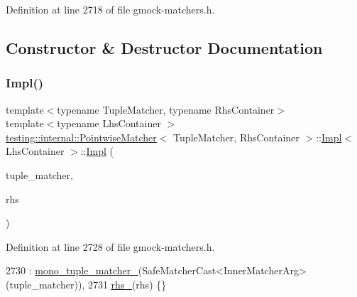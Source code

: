Definition at line 2718 of file gmock-\/matchers.\+h.



\subsection{Constructor \& Destructor Documentation}
\mbox{\label{classtesting_1_1internal_1_1PointwiseMatcher_1_1Impl_aaf6841b254ef78395919dfc5705dd152}} 
\subsubsection{\texorpdfstring{Impl()}{Impl()}}
{\footnotesize\ttfamily template$<$typename Tuple\+Matcher, typename Rhs\+Container$>$ \\
template$<$typename Lhs\+Container $>$ \\
\hyperlink{classtesting_1_1internal_1_1PointwiseMatcher}{testing\+::internal\+::\+Pointwise\+Matcher}$<$ Tuple\+Matcher, Rhs\+Container $>$\+::\hyperlink{classtesting_1_1internal_1_1PointwiseMatcher_1_1Impl}{Impl}$<$ Lhs\+Container $>$\+::\hyperlink{classtesting_1_1internal_1_1PointwiseMatcher_1_1Impl}{Impl} (\begin{DoxyParamCaption}\item[{const Tuple\+Matcher \&}]{tuple\+\_\+matcher,  }\item[{const \hyperlink{classtesting_1_1internal_1_1PointwiseMatcher_aadbaec8c93351f29b103816c2e397edd}{Rhs\+Stl\+Container} \&}]{rhs }\end{DoxyParamCaption})\hspace{0.3cm}{\ttfamily [inline]}}



Definition at line 2728 of file gmock-\/matchers.\+h.


\begin{DoxyCode}
2730         : \hyperlink{classtesting_1_1internal_1_1PointwiseMatcher_1_1Impl_ac94a851d56fe3f4f900da94cdc08c973}{mono\_tuple\_matcher\_}(SafeMatcherCast<InnerMatcherArg>(tuple\_matcher)),
2731           \hyperlink{classtesting_1_1internal_1_1PointwiseMatcher_1_1Impl_a7f00c6c50d20c8c274428106b6c8e9ab}{rhs\_}(rhs) \{\}
\end{DoxyCode}


